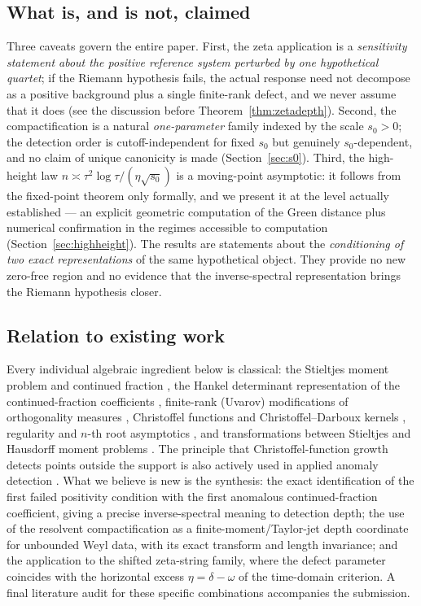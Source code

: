 \documentclass[11pt]{amsart}
\theoremstyle{definition}
\theoremstyle{remark}
\begin{document}
\subsection{What is, and is not, claimed}
Three caveats govern the entire paper. First, the zeta application is a
\emph{sensitivity statement about the positive reference system perturbed by
one hypothetical quartet}; if the Riemann hypothesis fails, the actual
response need not decompose as a positive background plus a single finite-rank
defect, and we never assume that it does (see the discussion before
Theorem~\ref{thm:zetadepth}). Second, the compactification is a natural
\emph{one-parameter} family indexed by the scale $s_0>0$; the detection order
is cutoff-independent for fixed $s_0$ but genuinely $s_0$-dependent, and no
claim of unique canonicity is made (Section~\ref{sec:s0}). Third, the
high-height law $n\asymp \tau^2\log\tau/(\eta\sqrt{s_0})$ is a moving-point
asymptotic: it follows from the fixed-point theorem only formally, and we
present it at the level actually established --- an explicit geometric
computation of the Green distance plus numerical confirmation in the regimes
accessible to computation (Section~\ref{sec:highheight}).
The results are statements about the \emph{conditioning of two exact
representations} of the same hypothetical object. They provide no new
zero-free region and no evidence that the inverse-spectral representation
brings the Riemann hypothesis closer.

\subsection{Relation to existing work}
Every individual algebraic ingredient below is classical: the Stieltjes
moment problem and continued fraction \cite{Stieltjes,Wall,Schmudgen}, the
Hankel determinant representation of the continued-fraction coefficients
\cite{Wall,GK}, finite-rank (Uvarov) modifications of orthogonality measures
\cite{Uvarov,Zhedanov}, Christoffel functions and Christoffel--Darboux
kernels \cite{Nevai,Totik}, regularity and $n$-th root asymptotics
\cite{StahlTotik}, and transformations between Stieltjes and Hausdorff moment
problems \cite{BergDurea}. The principle that Christoffel-function growth
detects points outside the support is also actively used in applied
anomaly detection \cite{LasserrePauwels,ChristoffelAnomaly2026,DataStreams}.
What we believe is new is the synthesis: the exact identification of the
first failed positivity condition with the first anomalous continued-fraction
coefficient, giving a precise inverse-spectral meaning to detection depth;
the use of the resolvent compactification as a finite-moment/Taylor-jet depth
coordinate for unbounded Weyl data, with its exact transform and length
invariance; and the application to the shifted zeta-string family, where the
defect parameter coincides with the horizontal excess $\eta=\delta-\omega$ of
the time-domain criterion. A final literature audit for these specific
combinations accompanies the submission.
\end{document}
